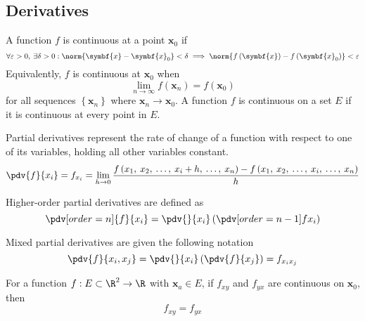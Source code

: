 \documentclass{article}
\begin{document}
\subsection{Derivatives}
\begin{definition}[Continuity]
    A function \(f\) is continuous at a point \(\symbf{x}_0\) if
    \begin{equation*}
        \forall \varepsilon > 0,\: \exists \delta > 0 : \norm{\symbf{x} - \symbf{x}_0} < \delta \implies \norm{f\left( \symbf{x} \right) - f\left( \symbf{x}_0 \right)} < \varepsilon
    \end{equation*}
    Equivalently, \(f\) is continuous at \(\symbf{x}_0\) when
    \begin{equation*}
        \lim_{n \to \infty} f\left( \symbf{x}_n \right) = f\left( \symbf{x}_0 \right)
    \end{equation*}
    for all sequences \(\left\{ \symbf{x}_n \right\} \) where \(\symbf{x}_n \to \symbf{x}_0\).
    A function \(f\) is continuous on a set \(E\) if it is continuous
    at every point in \(E\).
\end{definition}
\begin{definition}
    Partial derivatives represent the rate of change of a function with respect to one of its variables, holding all other variables constant.
    \begin{equation*}
        \pdv{f}{x_i} = f_{x_i} = \lim_{h \to 0} \frac{f\left( x_1,\: x_2,\: \ldots,\: x_i + h,\: \ldots,\: x_n \right) - f\left( x_1,\: x_2,\: \ldots,\: x_i,\: \ldots,\: x_n \right)}{h}
    \end{equation*}
\end{definition}
\begin{definition}
    Higher-order partial derivatives are defined as
    \begin{equation*}
        \pdv[order=n]{f}{x_i} = \pdv{}{x_i} \left( \pdv[order={n - 1}]{f}{x_i} \right)
    \end{equation*}
\end{definition}
\begin{definition}
    Mixed partial derivatives are given the following notation
    \begin{equation*}
        \pdv{f}{x_i,x_j} = \pdv{}{x_i} \left( \pdv{f}{x_j} \right) = f_{x_i x_j}
    \end{equation*}
\end{definition}
\begin{theorem}
    For a function \(f : E \subset \R^2 \to \R\) with \(\symbf{x}_a \in E\), if \(f_{xy}\) and \(f_{yx}\) are continuous on \(\symbf{x}_0\), then
    \begin{equation*}
        f_{xy} = f_{yx}
    \end{equation*}
\end{theorem}
\end{document}
